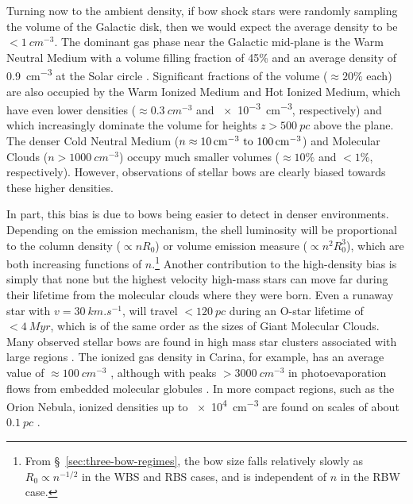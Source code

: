 Turning now to the ambient density, if bow shock stars were randomly
sampling the volume of the Galactic disk, then we would expect the
average density to be \(< \SI{1}{cm^{-3}}\).  The dominant gas phase
\citep{Ferriere:2001a} near the Galactic mid-plane is the Warm Neutral
Medium with a volume filling fraction of 45\% \citep[Fig.~11
of][]{Kalberla:2009a} and an average density of \SI{0.9}{cm^{-3}} at
the Solar circle \citep[\S~4 of][]{Kalberla:2008a}.  Significant
fractions of the volume (\(\approx 20\%\) each) are also occupied by the
Warm Ionized Medium and Hot Ionized Medium, which have even lower
densities (\(\approx \SI{0.3}{cm^{-3}}\) and \SI{e-3}{cm^{-3}},
respectively) and which increasingly dominate the volume for heights
\(z > \SI{500}{pc}\) above the plane.  The denser Cold Neutral Medium
(\(n \approx \text{\SIrange{10}{100}{cm^{-3}}}\)) and Molecular Clouds
(\(n > \SI{1000}{cm^{-3}}\)) occupy much smaller volumes
(\(\approx 10\%\) and \(< 1\%\), respectively).  However, observations of
stellar bows are clearly biased towards these higher densities.

In part, this bias is due to bows being easier to detect in denser
environments.  Depending on the emission mechanism, the shell
luminosity will be proportional to the column density
(\(\propto n R_0\)) or volume emission measure
(\(\propto n^2 R_0^3\)), which are both increasing functions of
\(n\).\footnote{%
  From \S~\ref{sec:three-bow-regimes}, the bow size falls relatively
  slowly as \(R_0 \propto n^{-1/2}\) in the WBS and RBS cases, and is
  independent of \(n\) in the RBW case.}  Another contribution to the
high-density bias is simply that none but the highest velocity
high-mass stars can move far during their lifetime from the molecular
clouds where they were born.  Even a runaway star with
\(v = \SI{30}{km.s^{-1}}\), will travel \(< \SI{120}{pc}\) during an
O-star lifetime of \(< \SI{4}{Myr}\), which is of the same order as
the sizes of Giant Molecular Clouds.  Many observed stellar bows are
found in high mass star clusters associated with large \hii{} regions
\citep{Povich:2008a, Sexton:2015b}.  The ionized gas density in
Carina, for example, has an average value of
\(\approx \SI{100}{cm^{-3}}\) \citep{Oberst:2011a, Damiani:2016a}, although
with peaks \(> \SI{3000}{cm^{-3}}\) in photoevaporation flows from
embedded molecular globules \citep{Smith:2004a}.  In more compact
\hii{} regions, such as the Orion Nebula, ionized densities up to
\SI{e4}{cm^{-3}} are found on scales of about \(\SI{0.1}{pc}\)
\citep{Weilbacher:2015a, ODell:2017b}.


